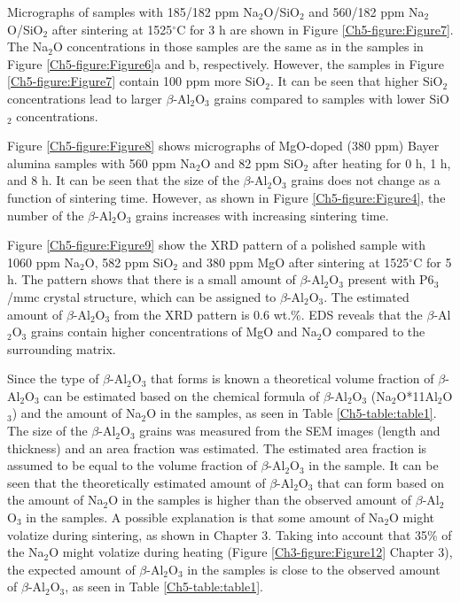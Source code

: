Micrographs of samples with 185/182 ppm Na$_{2}$O/SiO$_{2}$ and 560/182 ppm Na$_{2}$O/SiO$_{2}$ after sintering at 1525$^{\circ}$C for 3 h are shown in Figure \ref{Ch5-figure:Figure7}. The Na$_{2}$O concentrations in those samples are the same as in the samples in Figure \ref{Ch5-figure:Figure6}a and b, respectively. However, the samples in Figure \ref{Ch5-figure:Figure7} contain 100 ppm more SiO$_{2}$. It can be seen that higher SiO$_{2}$ concentrations lead to larger $\beta$-Al$_{2}$O$_{3}$ grains compared to samples with lower SiO$_{2}$ concentrations.

Figure \ref{Ch5-figure:Figure8} shows micrographs of MgO-doped (380 ppm) Bayer alumina samples with 560 ppm Na$_{2}$O and 82 ppm SiO$_{2}$ after heating for 0 h, 1 h, and 8 h. It can be seen that the size of the $\beta$-Al$_{2}$O$_{3}$ grains does not change as a function of sintering time. However, as shown in Figure \ref{Ch5-figure:Figure4}, the number of the $\beta$-Al$_{2}$O$_{3}$ grains increases with increasing sintering time.

Figure \ref{Ch5-figure:Figure9} show the XRD pattern of a polished sample with 1060 ppm Na$_{2}$O, 582 ppm SiO$_{2}$ and 380 ppm MgO after sintering at 1525$^{\circ}$C for 5 h. The pattern shows that there is a small amount of $\beta$-Al$_{2}$O$_{3}$ present with P6$_{3}$/mmc crystal structure, which can be assigned to $\beta$-Al$_{2}$O$_{3}$. The estimated amount of $\beta$-Al$_{2}$O$_{3}$ from the XRD pattern is 0.6 wt.\%. EDS reveals that the $\beta$-Al$_{2}$O$_{3}$ grains contain higher concentrations of MgO and Na$_{2}$O compared to the surrounding matrix.

Since the type of $\beta$-Al$_{2}$O$_{3}$ that forms is known a theoretical volume fraction of $\beta$-Al$_{2}$O$_{3}$ can be estimated based on the chemical formula of $\beta$-Al$_{2}$O$_{3}$ (Na$_{2}$O*11Al$_{2}$O$_{3}$) and the amount of Na$_{2}$O in the samples, as seen in Table \ref{Ch5-table:table1}. The size of the $\beta$-Al$_{2}$O$_{3}$ grains was measured from the SEM images (length and thickness) and an area fraction was estimated. The estimated area fraction is assumed to be equal to the volume fraction of $\beta$-Al$_{2}$O$_{3}$ in the sample. It can be seen that the theoretically estimated amount of $\beta$-Al$_{2}$O$_{3}$ that can form based on the amount of Na$_{2}$O in the samples is higher than the observed amount of $\beta$-Al$_{2}$O$_{3}$ in the samples. A possible explanation is that some amount of Na$_{2}$O might volatize during sintering, as shown in Chapter 3. Taking into account that 35\% of the Na$_{2}$O might volatize during heating (Figure \ref{Ch3-figure:Figure12} Chapter 3), the expected amount of $\beta$-Al$_{2}$O$_{3}$ in the samples is close to the observed amount of $\beta$-Al$_{2}$O$_{3}$, as seen in Table \ref{Ch5-table:table1}.

